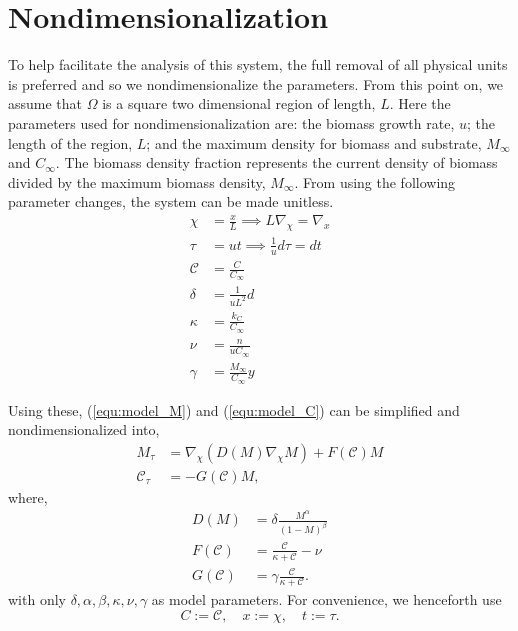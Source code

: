 \section{Nondimensionalization}
 
To help facilitate the analysis of this system, the full removal of all physical units is preferred and so we nondimensionalize the parameters.
From this point on, we assume that $\Omega$ is a square two dimensional region of length, $L$. 
Here the parameters used for nondimensionalization are: the biomass growth rate, $u$; the length of the region, $L$; and the maximum density for biomass and substrate, $M_\infty$ and $C_\infty$.
The biomass density fraction represents the current density of biomass divided by the maximum biomass density, $M_{\infty}$.
From using the following parameter changes, the system can be made unitless.
\begin{align}
  \chi &= \frac{x}{L} \implies L \nabla_\chi= \nabla_x \\
  \tau &= u t \implies \frac{1}{u} d\tau= dt \\
  \mathcal{C} &= \frac{C}{C_{\infty}} \\
  \delta &= \frac{1}{u L^2} d \\
  \kappa &= \frac{k_C}{C_\infty} \\
  \nu &= \frac{n}{u C_\infty} \\
  \gamma &= \frac{M_\infty}{C_\infty} y
\end{align}

Using these, (\ref{equ:model_M}) and (\ref{equ:model_C}) can be simplified and nondimensionalized into, 
\begin{align} \label{equ:model_system}
  M_\tau &= \nabla_\chi \left( D(M) \nabla_\chi M \right) + F(\mathcal{C}) M \\
  \mathcal{C}_\tau &= - G(\mathcal{C}) M, 
\end{align}
where,
\begin{equation}
\begin{aligned} \label{equ:model_functions}
  D(M) &= \delta \frac{M^\alpha}{(1 - M)^\beta} \\
  F(\mathcal{C}) &= \frac{ \mathcal{C}} {\kappa + \mathcal{C}} - \nu \\
  G(\mathcal{C}) &= \gamma \frac{\mathcal{C}}{\kappa +\mathcal{C}}.
\end{aligned}
\end{equation}
with only $\delta, \alpha, \beta, \kappa, \nu, \gamma$ as model parameters. 
For convenience, we henceforth use
\begin{equation}
  C := \mathcal{C},\quad x := \chi,\quad t := \tau.
\end{equation}

